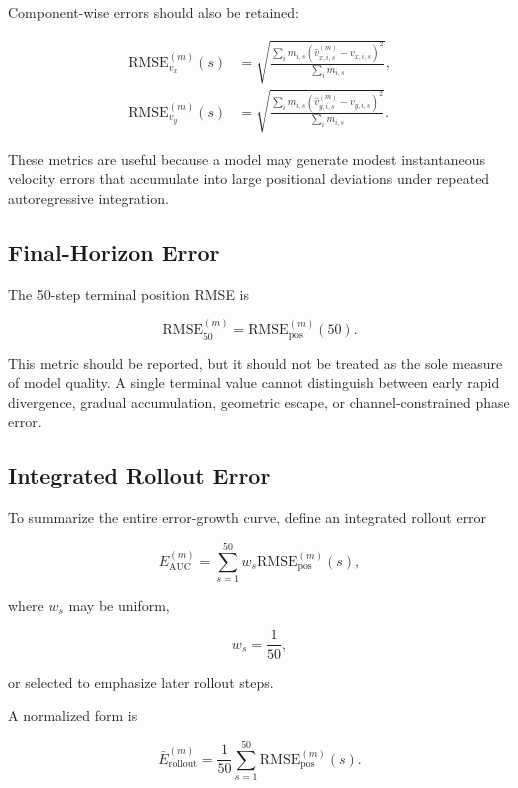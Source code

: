\documentclass[11pt]{article}
\begin{document}
Component-wise errors should also be retained:

\begin{align}
\mathrm{RMSE}_{v_x}^{(m)}(s)
&=
\sqrt{
\frac{
\sum_i m_{i,s}
\left(
\hat{v}_{x,i,s}^{(m)}
-
v_{x,i,s}
\right)^2
}{
\sum_i m_{i,s}
}
},
\\
\mathrm{RMSE}_{v_y}^{(m)}(s)
&=
\sqrt{
\frac{
\sum_i m_{i,s}
\left(
\hat{v}_{y,i,s}^{(m)}
-
v_{y,i,s}
\right)^2
}{
\sum_i m_{i,s}
}
}.
\end{align}

These metrics are useful because a model may generate modest instantaneous velocity errors that accumulate into large positional deviations under repeated autoregressive integration.

\subsection{Final-Horizon Error}

The 50-step terminal position RMSE is

\begin{equation}
\mathrm{RMSE}_{50}^{(m)}
=
\mathrm{RMSE}_{\mathrm{pos}}^{(m)}(50).
\end{equation}

This metric should be reported, but it should not be treated as the sole measure of model quality. A single terminal value cannot distinguish between early rapid divergence, gradual accumulation, geometric escape, or channel-constrained phase error.

\subsection{Integrated Rollout Error}

To summarize the entire error-growth curve, define an integrated rollout error

\begin{equation}
E_{\mathrm{AUC}}^{(m)}
=
\sum_{s=1}^{50}
w_s
\mathrm{RMSE}_{\mathrm{pos}}^{(m)}(s),
\end{equation}

where \(w_s\) may be uniform,

\begin{equation}
w_s=\frac{1}{50},
\end{equation}

or selected to emphasize later rollout steps.

A normalized form is

\begin{equation}
\bar{E}_{\mathrm{rollout}}^{(m)}
=
\frac{1}{50}
\sum_{s=1}^{50}
\mathrm{RMSE}_{\mathrm{pos}}^{(m)}(s).
\end{equation}
\end{document}
